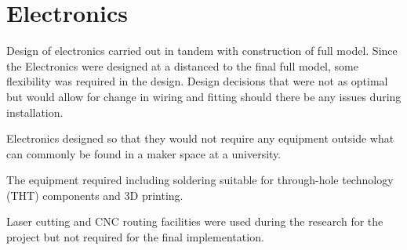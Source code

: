 



\section{Electronics}\label{electronics}

Design of electronics carried out in tandem with construction of full
model. Since the Electronics were designed at a distanced to the final
full model, some flexibility was required in the design. Design decisions
that were not as optimal but would allow for change in wiring and
fitting should there be any issues during installation.

Electronics designed so that they would not require any equipment
outside what can commonly be found in a maker space at a university.

The equipment required including soldering suitable for through-hole
technology (THT) components and 3D printing.

Laser cutting and CNC routing facilities were used during the research
for the project but not required for the final implementation.

